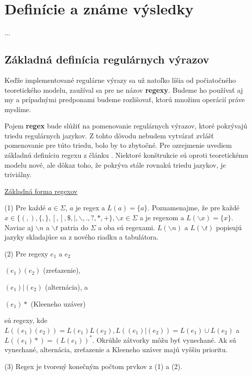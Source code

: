 \chapter{Definície a známe výsledky}
\label{chap:kapitola1}
...

\section{Základná definícia regulárnych výrazov}
\label{def}

Keďže implementované regulárne výrazy sa už natoľko líšia od počiatočného teoretického modelu, zaužíval sa pre ne názov \textbf{regexy}. Budeme ho používať aj my a prípadnými predponami budeme rozlišovať, ktorú množinu operácií práve myslíme.

Pojem \textbf{regex} bude slúžiť na pomenovanie regulárnych výrazov, ktoré pokrývajú triedu regulárnych jazykov. Z tohto dôvodu nebudem vytvárať zvlášť pomenovanie pre túto triedu, bolo by to zbytočné. Pre ozrejmenie uvediem základnú definíciu regexu z článku \cite{ExtendedRegexPower}. Niektoré konštrukcie sú oproti teoretickému modelu nové, ale dôkaz toho, že pokrýva stále rovnakú triedu jazykov, je triviálny.

\underline{Základná forma regexov}
\begin{list}{}{}
\item[(1)] Pre každé $a \in \Sigma$, $a$ je regex a $L(a)=\lbrace a \rbrace$. Poznamenajme, že pre každé $x \in \lbrace (,), \{, \},[,],\mathdollar,|, \backslash, .,?,*,+ \rbrace, \backslash x \in \Sigma $ a je regexom a $L(\backslash x) = \lbrace x \rbrace$. Naviac aj $\backslash n$ a $\backslash t$ patria do $\Sigma$ a oba sú regexami. $L(\backslash n)$ a $L(\backslash t)$ popisujú jazyky skladajúce sa z nového riadku a tabulátora.
\item[(2)] Pre regexy $e_1$ a $e_2$ 
\begin{list}{}{}
\item $(e_1)(e_2)$ (zreťazenie), 
\item $(e_1)|(e_2)$ (alternácia), a 
\item $(e_1)*$ (Kleeneho uzáver) 
\end{list}
sú regexy, kde $L((e_1)(e_2)) = L(e_1)L(e_2), L((e_1)|(e_2))=L(e_1) \cup L(e_2)$ a $L((e_1)*) = (L(e_1))^*$. Okrúhle zátvorky môžu byť vynechané. Ak sú vynechané, alternácia, zreťazenie a Kleeneho uzáver majú vyššiu prioritu.
\item[(3)] Regex je tvorený konečným počtom prvkov z (1) a (2).
\end{list}

